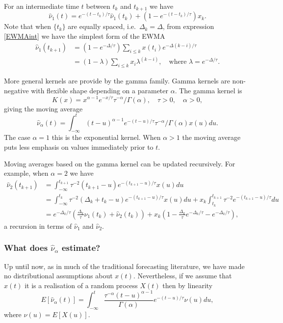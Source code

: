 For an intermediate time $t$ between $t_k$ and $t_{k+1}$ we have 
\begin{equation}\hat{\nu}_1(t) = e^{-(t-t_k)/\tau} \hat{\nu}_1(t_{k}) + (1-e^{-(t-t_k)/\tau}) x_k.\end{equation}
Note that when $\{t_k\}$ are equally spaced, i.e.\ $\Delta_k = \Delta$, from expression \eqref{EWMAint} we have the simplest form of the EWMA
\begin{align} \hat{\nu}_1(t_{k+1}) &= (1-e^{-\Delta/\tau}) \sum_{i \leqslant k} x(t_i)e^{-\Delta(k-i)/\tau}\nonumber\\
&= (1-\lambda) \sum_{i \leqslant k} x_i \lambda^{(k-i)}, \quad \text{where $\lambda = e^{-\Delta/\tau}$}.
\end{align}

More general kernels are provide by the gamma family. Gamma kernels are non-negative with flexible shape depending on a parameter $\alpha$. The gamma kernel is
$$ K(x) = x^{\alpha-1} e^{-x/\tau} \tau^{-\alpha}/\Gamma(\alpha), \quad \tau > 0, \quad 
\alpha > 0,$$
giving the moving average
$$ \hat{\nu}_{\alpha}(t) = \int_{-\infty}^t (t-u)^{\alpha-1} e^{-(t-u)/\tau} \tau^{-\alpha}/\Gamma(\alpha)x(u) du.$$
The case $\alpha=1$ this is the exponential kernel. When $\alpha > 1$ the moving average puts less emphasis on values immediately prior to $t$.

Moving averages based on the gamma kernel can be updated recursively. For example, when $\alpha = 2$ we have
\begin{align*}
\hat{\nu}_2(t_{k+1}) &= \int_{-\infty}^{t_{k+1}} \tau^{-2}(t_{k+1}-u) e^{-(t_{k+1}-u)/\tau} x(u) du\\
&= \int_{-\infty}^{t_k} \tau^{-2}(\Delta_k +t_k -u) e^{-(t_{k+1}-u)/\tau} x(u) du + x_k\int_{t_k}^{t_{k+1}}\tau^{-2} e^{-(t_{k+1}-u)/\tau}du\\
&= e^{-\Delta_k/\tau}\left(\frac{\Delta_k}{\tau}\hat{\nu}_1(t_k)  +\hat{\nu}_2(t_k)\right) + x_k\left(1 - \frac{\Delta_k}{\tau}e^{-\Delta_k/\tau} - e^{-\Delta_k/\tau}\right), 
\end{align*}
a recursion in terms of $\hat{\nu}_1$ and $\hat{\nu}_2$.

\subsubsection*{What does $\hat{\nu}_\alpha$ estimate?}
Up until now, as in much of the traditional forecasting literature, we have made no distributional assumptions about $x(t)$. Nevertheless, if we assume that $x(t)$ it is a realisation of a random process $X(t)$ then by linearity
\begin{equation}\label{eq:zerolag}
E[\hat{\nu}_\alpha(t)] = \int_{-\infty}^t \frac{\tau^{-\alpha} (t-u)^{\alpha-1}}{\Gamma(\alpha)} e^{-(t-u)/\tau}\nu(u) du,
\end{equation}
where $\nu(u) = E[X(u)]$.


